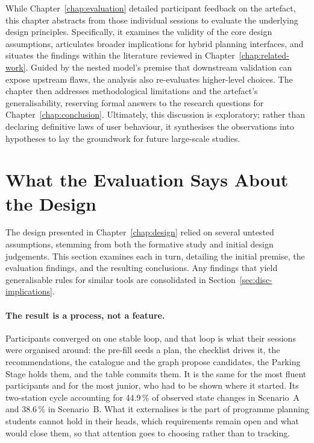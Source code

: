 \label{chap:discussion}
While Chapter~\ref{chap:evaluation} detailed participant feedback on the artefact, this chapter abstracts from those individual sessions to evaluate the underlying design principles. Specifically, it examines the validity of the core design assumptions, articulates broader implications for hybrid planning interfaces, and situates the findings within the literature reviewed in Chapter~\ref{chap:related-work}. Guided by the nested model's premise that downstream validation can expose upstream flaws, the analysis also re-evaluates higher-level choices. The chapter then addresses methodological limitations and the artefact's generalisability, reserving formal answers to the research questions for Chapter~\ref{chap:conclusion}. Ultimately, this discussion is exploratory; rather than declaring definitive laws of user behaviour, it synthesises the observations into hypotheses to lay the groundwork for future large-scale studies.

\section{What the Evaluation Says About the Design}
\label{sec:disc-assumptions}
\label{sec:disc-interpretation}

The design presented in Chapter~\ref{chap:design} relied on several untested assumptions, stemming from both the formative study and initial design judgements. This section examines each in turn, detailing the initial premise, the evaluation findings, and the resulting conclusions. Any findings that yield generalisable rules for similar tools are consolidated in Section~\ref{sec:disc-implications}.

\paragraph{The result is a process, not a feature.}
Participants converged on one stable loop, and that loop is what their sessions were organised around: the pre-fill seeds a plan, the checklist drives it, the recommendations, the catalogue and the graph propose candidates, the Parking Stage holds them, and the table commits them. It is the same for the most fluent participants and for the most junior, who had to be shown where it started. Its two-station cycle accounting for 44.9\,\% of observed state changes in Scenario~A and 38.6\,\% in Scenario~B. What it externalises is the part of programme planning students cannot hold in their heads, which requirements remain open and what would close them, so that attention goes to choosing rather than to tracking.

